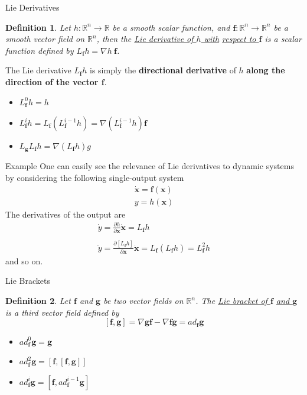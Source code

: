 \documentclass{beamer}
\renewcommand{\vec}[1]{\ensuremath{\boldsymbol{#1}}} %
\begin{document}
\begin{frame}{Lie Derivatives}
    \newtheorem{myDef}{Definition}
    \begin{myDef}
        Let $h : \mathbb{R}^{n} \rightarrow \mathbb{R}$ be a smooth scalar function, and $\vec{f} : \mathbb{R}^{n} \rightarrow \mathbb{R}^{n}$ be a smooth vector field on $\mathbb{R}^{n}$, then the \underline{Lie derivative of $h$ with}
        \underline{respect to \vec{f}} is a scalar function defined by {\color{red} $L_{\vec{f}}h = \nabla h ~\vec{f}$}.
    \end{myDef}

    The Lie derivative $L_{\vec{f}}h$ is simply the \textbf{directional derivative} of $h$ \textbf{along the direction of the vector \vec{f}}.
    \begin{itemize}
      \item $L_{\vec{f}}^{0}h = h$
      \item $L_{\vec{f}}^{i}h = L_{\vec{f}}(L_{\vec{f}}^{i-1}h) = \nabla(L_{\vec{f}}^{i-1}h )\vec{f}$
      \item $L_{\vec{g}}L_{\vec{f}}h = \nabla(L_{\vec{f}}h)g $
    \end{itemize}

\end{frame}

\begin{frame}{Example}
    One can easily see the relevance of Lie derivatives to dynamic systems by considering the following single-output system
    $$
    \begin{array}{l}{\dot{\mathbf{x}}=\mathbf{f}(\mathbf{x})} \\ {y=h(\mathbf{x})}\end{array}
    $$
    The derivatives of the output are
    $$
    \begin{array}{l}{\dot{y}=\frac{\partial h}{\partial \mathbf{x}} \dot{\mathbf{x}}=L_{\mathbf{f}} h} \\ \\
    {\ddot{y}=\frac{\partial\left[L_{\mathbf{f}} h\right]}{\partial \mathbf{x}} \dot{\mathbf{x}} = L_{\mathbf{f}}(L_{\mathbf{f}}h) = L_{\mathbf{f}}^{2} h}\end{array}
    $$
    and so on.
\end{frame}


\begin{frame}{Lie Brackets}
    \begin{myDef}
        Let \vec{f} and \vec{g} be two vector fields on $\mathbb{R}^{n}$. The \underline{Lie bracket of \vec{f}}
        \underline{and \vec{g}} is a third vector field defined by
        $$
        [\vec{f}, \vec{g}] = \nabla \vec{g} \vec{f} - \nabla \vec{f} \vec{g} = ad_{\vec{f}}\vec{g}
        $$
    \end{myDef}
    \begin{itemize}
      \item $ad_{\vec{f}}^{0}\vec{g} = \vec{g}$
      \item $ad_{\vec{f}}^{2}\vec{g} = [\vec{f}, [\vec{f}, \vec{g}]]$
      \item $ad_{\vec{f}}^{i}\vec{g} = [\vec{f}, ad_{\vec{f}}^{i-1}\vec{g}]$
    \end{itemize}
\end{frame}
\end{document}
